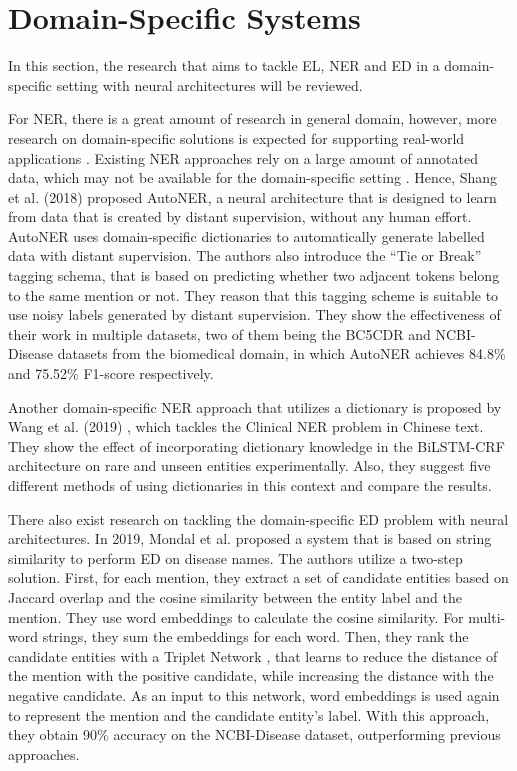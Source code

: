 \documentclass{report}
\theoremstyle{definition}
\theoremstyle{remark}
\begin{document}
\section{Domain-Specific Systems}
\label{domSpec}
In this section, the research that aims to tackle EL, NER and ED in a domain-specific setting with neural architectures will be reviewed.

For NER, there is a great amount of research in general domain, however, more research on domain-specific solutions is expected for supporting real-world applications \cite{quote1}. Existing NER approaches rely on a large amount of annotated data, which may not be available for the domain-specific setting \cite{NERDict2}. Hence, Shang et al. (2018) \cite{NERDict2} proposed AutoNER, a neural architecture that is designed to learn from data that is created by distant supervision, without any human effort. AutoNER uses domain-specific dictionaries to automatically generate labelled data with distant supervision. The authors also introduce the ``Tie or Break'' tagging schema, that is based on predicting whether two adjacent tokens belong to the same mention or not. They reason that this tagging scheme is suitable to use noisy labels generated by distant supervision. They show the effectiveness of their work in multiple datasets, two of them being the BC5CDR \cite{bc5cdr} and NCBI-Disease \cite{ncbi} datasets from the biomedical domain, in which AutoNER achieves 84.8\% and 75.52\% F1-score respectively.

Another domain-specific NER approach that utilizes a dictionary is proposed by Wang et al. (2019) \cite{MedDict}, which tackles the Clinical NER problem in Chinese text. They show the effect of incorporating dictionary knowledge in the BiLSTM-CRF \cite{BiLSTMCRF} architecture on rare and unseen entities experimentally. Also, they suggest five different methods of using dictionaries in this context and compare the results. 

There also exist research on tackling the domain-specific ED problem with neural architectures. In 2019, Mondal et al. \cite{MedicalTriplet} proposed a system that is based on string similarity to perform ED on disease names. The authors utilize a two-step solution. First, for each mention, they extract a set of candidate entities based on Jaccard overlap and the cosine similarity between the entity label and the mention. They use word embeddings to calculate the cosine similarity. For multi-word strings, they sum the embeddings for each word. Then, they rank the candidate entities with a Triplet Network \cite{tripletNetwork}, that learns to reduce the distance of the mention with the positive candidate, while increasing the distance with the negative candidate. As an input to this network, word embeddings is used again to represent the mention and the candidate entity's label. With this approach, they obtain 90\% accuracy on the NCBI-Disease \cite{ncbi} dataset, outperforming previous approaches. 
\end{document}
